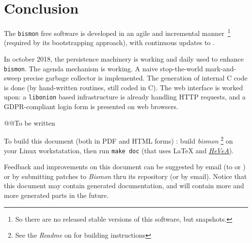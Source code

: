 \section{Conclusion}

The \texttt{bismon} free software is developed in an agile and
incremental manner~\footnote{So there are no released stable versions
  of this software, but snapshots.} (required by its bootstrapping
approach), with continuous updates to
.

In october 2018, the persistence machinery is working and daily used
to enhance \texttt{bismon}. The agenda mechanism is working. A naive
stop-the-world mark-and-sweep precise garbage collector is
implemented. The generation of internal C code is done (by
hand-written routines, still coded in C). The web interface is worked
upon: a \texttt{libonion} based infrastructure is already handling
HTTP requests, and a GDPR-compliant login form is presented on web
browsers.

@@To be written

\medskip


\begin{boxedminipage}{0.6\textwidth}

To build this document (both in PDF and HTML forms) : build
\emph{bismon} \footnote{See the \emph{Readme} on
   for building
  instructions} on your Linux workstatation, then run \texttt{make
  doc} (that uses {\LaTeX} and
\href{http://hevea.inria.fr/}{\emph{HeVeA}}).

Feedback and improvements on this document can be suggested by email
(to  or
) or by submitting patches to
\textit{Bismon} thru its  repository
(or by email). Notice that this document may contain generated
documentation, and will contain more and more generated parts in the
future.
\end{boxedminipage}
